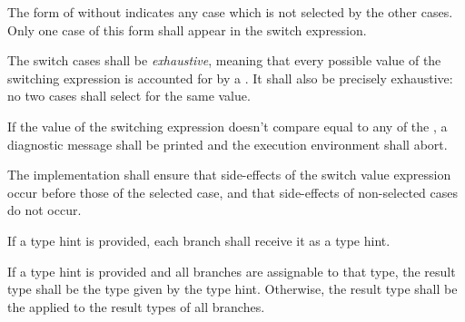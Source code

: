 
\specsubsubitem
The form of  without 
indicates any case which is not selected by the other cases. Only one case of
this form shall appear in the switch expression.

\specsubsubitem
The switch cases shall be \textit{exhaustive}, meaning that every possible
value of the switching expression is accounted for by a
. It shall also be precisely exhaustive: no two cases
shall select for the same value.

\specsubsubitem
If the value of the switching expression doesn't compare equal to any of the
, a diagnostic message shall be printed and the
execution environment shall abort.


\specsubsubitem
The implementation shall ensure that side-effects of the switch value
expression occur before those of the selected case, and that side-effects of
non-selected cases do not occur.

\specsubsubitem
If a type hint is provided, each branch shall receive it as a type hint.

\specsubsubitem
If a type hint is provided and all branches are assignable to that type, the
result type shall be the type given by the type hint. Otherwise, the result type
shall be the  applied to the result
types of all branches.


\begin{grammar}
 \\
	 \terminal{(}  \terminal{)} \terminal{\{}  \terminal{\}} \\

 \\
	  \\

 \\
	   \terminal{:}  \terminal{=>}  \\
	  \terminal{(}  \terminal{)} \terminal{:}  \terminal{=>}  \\
	  \terminal{=>}  \\
	 \terminal{=>}  \\
\end{grammar}

